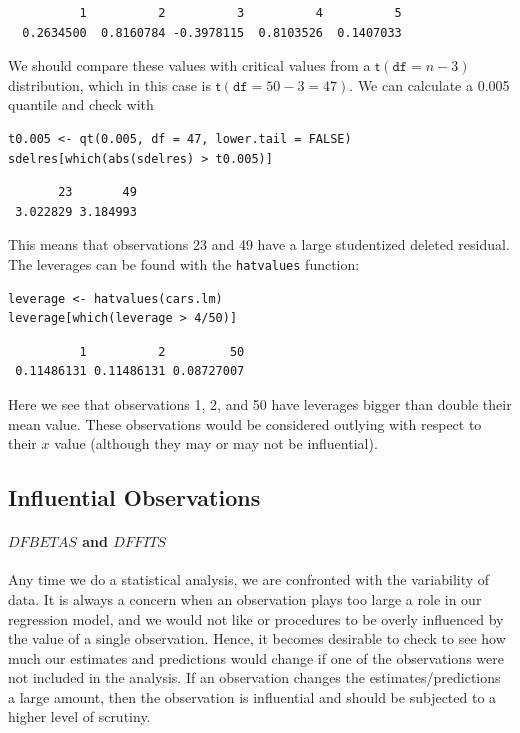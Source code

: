\documentclass[captions=tableheading]{scrbook}
\begin{document}
\begin{verbatim}
          1          2          3          4          5 
  0.2634500  0.8160784 -0.3978115  0.8103526  0.1407033
\end{verbatim}

We should compare these values with critical values from a \(\mathsf{t}(\mathtt{df}=n-3)\) distribution, which in this case is \(\mathsf{t}(\mathtt{df}=50-3=47)\). We can calculate a 0.005 quantile and check with 


\begin{verbatim}
t0.005 <- qt(0.005, df = 47, lower.tail = FALSE)
sdelres[which(abs(sdelres) > t0.005)]
\end{verbatim}

\begin{verbatim}
       23       49 
 3.022829 3.184993
\end{verbatim}

This means that observations 23 and 49 have a large studentized deleted residual. The leverages can be found with the \texttt{hatvalues} function:


\begin{verbatim}
leverage <- hatvalues(cars.lm)
leverage[which(leverage > 4/50)]
\end{verbatim}

\begin{verbatim}
          1          2         50 
 0.11486131 0.11486131 0.08727007
\end{verbatim}

Here we see that observations 1, 2, and 50 have leverages bigger than double their mean value. These observations would be considered outlying with respect to their \(x\) value (although they may or may not be influential).
\subsection{Influential Observations}
\label{sec-11-5-4}


\paragraph*{\(DFBETAS\) and \(DFFITS\)}

Any time we do a statistical analysis, we are confronted with the variability of data. It is always a concern when an observation plays too large a role in our regression model, and we would not like or procedures to be overly influenced by the value of a single observation. Hence, it becomes desirable to check to see how much our estimates and predictions would change if one of the observations were not included in the analysis. If an observation changes the estimates/predictions a large amount, then the observation is influential and should be subjected to a higher level of scrutiny.
\end{document}
